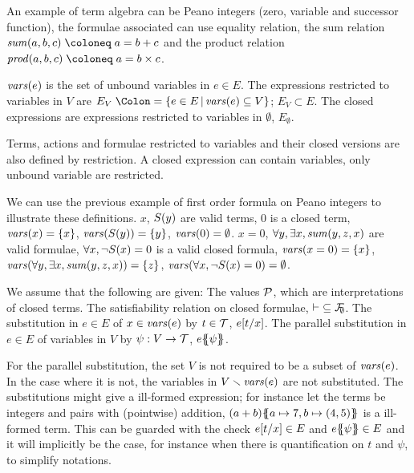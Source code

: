 \documentclass{article}
\begin{document}
An example of term algebra can be Peano integers (zero, variable and successor function), the formulae associated can use equality relation, the sum relation \(\mathit{sum}\mpar{a, b, c} \defobject a = b + c\) and the product relation \(\mathit{prod}\mpar{a, b, c} \defobject a = b \times c\).

\begin{defi}
 \(\mathit{vars}{\left(e\right)}\) is the set of unbound variables in \(e \in E\).
 The expressions restricted to variables in \(V\) are \(E_V \defnotation \mset{e \in E}{\fvars{e} \subseteq V}\); \(E_V \subset E\).
 The closed expressions are expressions restricted to variables in \(\emptyset\), \(E_\emptyset\).
\end{defi}
Terms, actions and formulae restricted to variables and their closed versions are also defined by restriction.
A closed expression can contain variables, only unbound variable are restricted.

We can use the previous example of first order formula on Peano integers to illustrate these definitions.
\(x\), \(S{\left(y\right)}\) are valid terms, \(0\) is a closed term, \(\mathit{vars}{\left(x\right)} = {\left\{x\right\}}\), \(\mathit{vars}{\left(S{\left(y\right)}\right)} = {\left\{y\right\}}\), \(\mathit{vars}{\left(0\right)} = \emptyset\).
\(x = 0\), \(\forall y, \exists x, \mathit{sum}{\left(y, z, x\right)}\) are valid formulae, \(\forall x, \neg S{\left(x\right)} = 0\) is a valid closed formula, \(\mathit{vars}{\left(x = 0\right)} = {\left\{x\right\}}\), \(\mathit{vars}{\left(\forall y, \exists x, \mathit{sum}{\left(y, z, x\right)}\right)} = {\left\{z\right\}}\), \(\mathit{vars}{\left(\forall x, \neg S{\left(x\right)} = 0\right)} = \emptyset\).

\begin{defi}
We assume that the following are given:
 The values \(\mathcal{P}\), which are interpretations of closed terms.
 The satisfiability relation on closed formulae, \({\vdash} \subseteq {\mathcal{F}}_{\!\!\emptyset}\).
 The substitution in \(e \in E\) of \(x \in \mathit{vars}{\left(e\right)}\) by \(t \in {\mathcal{T}}\), \(e{\left[t\middle/x\right]}\).
 The parallel substitution in \(e \in E\) of variables in \(V\) by \(\psi: V \to {\mathcal{T}}\), \(e{\left\{\!\!{\left\{\psi\right\}}\!\!\right\}}\).
\end{defi}
For the parallel substitution, the set \(V\) is not required to be a subset of \(\mathit{vars}{\left(e\right)}\).
In the case where it is not, the variables in \(V \smallsetminus \mathit{vars}{\left(e\right)}\) are not substituted.
The substitutions might give a ill-formed expression; for instance let the terms be integers and pairs with (pointwise) addition, \({\left(a + b\right)}{\left\{\!\!{\left\{a \mapsto 7, b \mapsto {\left(4, 5\right)}\right\}}\!\!\right\}}\) is a ill-formed term.
This can be guarded with the check \(e{\left[t\middle/x\right]} \in E\) and \(e{\left\{\!\!{\left\{\psi\right\}}\!\!\right\}} \in E\) and it will implicitly be the case, for instance when there is quantification on \(t\) and \(\psi\), to simplify notations.
\end{document}
